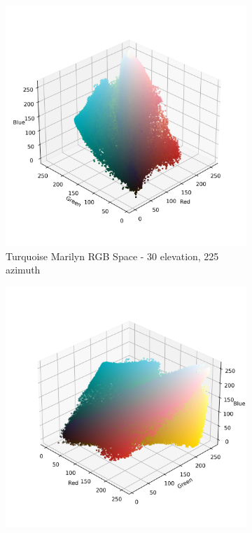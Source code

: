 \documentclass{article}
\begin{document}
\begin{figure}[ht]\ContinuedFloat
  \centering
  \begin{subfigure}{0.45\textwidth}
    \includegraphics[width=\textwidth]{main_files/figure-latex/4_11_turq_marilyn_original_scatter.jpg}
    \caption{Turquoise Marilyn RGB Space - 30 \degree elevation, 225 \degree azimuth}
    \label{fig:4_11_turq_marilyn_original_scatter}
  \end{subfigure}
  \hfill
  \begin{subfigure}{0.45\textwidth}
    \includegraphics[width=\textwidth]{main_files/figure-latex/4_12_turq_marilyn_original_scatter.jpg}

\end{subfigure}
\end{figure}
\end{document}
